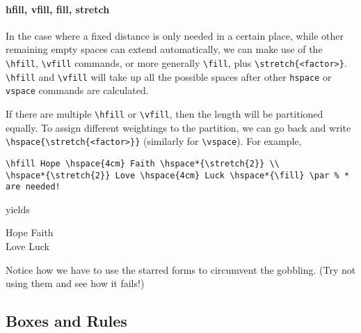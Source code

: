 \paragraph{hfill, vfill, fill, stretch}
In the case where a fixed distance is only needed in a certain place, while other remaining empty spaces can extend automatically, we can make use of the \texttt{\textbackslash hfill}, \texttt{\textbackslash vfill} commands, or more generally \texttt{\textbackslash fill}, plus \texttt{\textbackslash stretch\{<factor>\}}. \texttt{\textbackslash hfill} and \texttt{\textbackslash vfill} will take up all the possible spaces after other \texttt{\text hspace} or \texttt{\text vspace} commands are calculated.

If there are multiple \texttt{\textbackslash hfill} or \texttt{\textbackslash vfill}, then the length will be partitioned equally. To assign different weightings to the partition, we can go back and write \texttt{\textbackslash hspace\{\textbackslash stretch\{<factor>\}\}} (similarly for \texttt{\textbackslash vspace}). For example,
\begin{lstlisting}
\hfill Hope \hspace{4cm} Faith \hspace*{\stretch{2}} \\
\hspace*{\stretch{2}} Love \hspace{4cm} Luck \hspace*{\fill} \par % * are needed!
\end{lstlisting}
yields \par
\hfill Hope \hspace{4cm} Faith  \\
 Love \hspace{4cm} Luck \hspace*{\fill} \par
Notice how we have to use the starred forms to circumvent the gobbling. (Try not using them and see how it fails!)

\subsection{Boxes and Rules}

